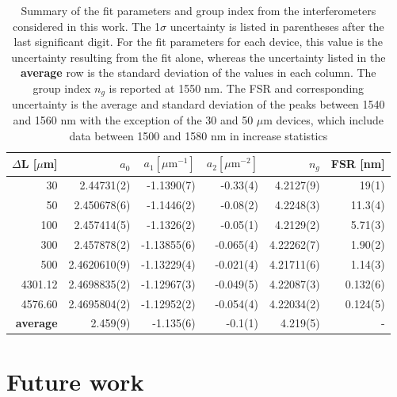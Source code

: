 \documentclass[journal]{IEEEtran}
\begin{document}
\begin{table}
\centering
\begin{tabular}{ r | r | r | r | r | r }
  \hline
  $\Delta$L [$\mu$m] & $a_0$         & $a_1 [\mu\text{m}^{-1}]$  & $a_2 [\mu\text{m}^{-2}]$ & $n_g$         & FSR [nm]\\
  \hline
  30                  & 2.44731(2)   & -1.1390(7)   & -0.33(4) & 4.2127(9)  & 19(1) \\
  50                  & 2.450678(6)  & -1.1446(2)   & -0.08(2) & 4.2248(3)  & 11.3(4)\\
  100                 & 2.457414(5)  & -1.1326(2)   & -0.05(1) & 4.2129(2)  & 5.71(3)\\
  300                 & 2.457878(2)  & -1.13855(6)  & -0.065(4) & 4.22262(7)& 1.90(2) \\
  500                 & 2.4620610(9) & -1.13229(4)  & -0.021(4) & 4.21711(6)& 1.14(3) \\
  4301.12             & 2.4698835(2) & -1.12967(3)  & -0.049(5) & 4.22087(3)& 0.132(6) \\
  4576.60             & 2.4695804(2) & -1.12952(2)  & -0.054(4) & 4.22034(2)& 0.124(5) \\
  \textbf{average}    & 2.459(9)     & -1.135(6)    & -0.1(1) & 4.219(5)    & -\\
\end{tabular}
\caption{Summary of the fit parameters and group index from the interferometers considered in this work. The 1$\sigma$ uncertainty is listed in parentheses after the last significant digit. For the fit parameters for each device, this value is the uncertainty resulting from the fit alone, whereas the uncertainty listed in the \textbf{average} row is the standard deviation of the values in each column. The group index $n_g$ is reported at 1550 nm. The FSR and corresponding uncertainty is the average and standard deviation of the peaks between 1540 and 1560 nm with the exception of the 30 and 50 $\mu$m devices, which include data between 1500 and 1580 nm in increase statistics}
\label{tab:summary}
\end{table}

\section{Future work}
\end{document}

